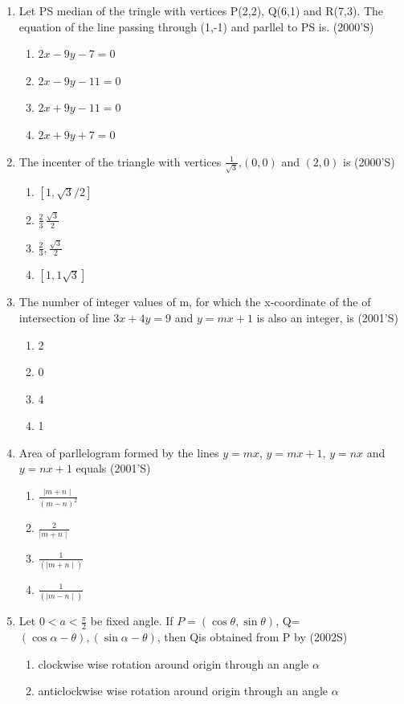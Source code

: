 \documentclass[12pt]{article}
\begin{document}
\begin{enumerate}
\item Let PS median of the tringle with vertices P(2,2), Q(6,1) and R(7,3). The equation of the line passing through (1,-1) and parllel to PS is. (2000'S)
\begin{enumerate}
\item $2x-9y-7=0$ 
\item $2x-9y-11=0$ 
\item $2x+9y-11=0$
\item $2x+9y+7=0$
\end{enumerate}
\item The incenter of the triangle with vertices $\frac{1}{\sqrt{3}}$,$(0,0)$ and $(2,0)$ is (2000'S)
\begin{enumerate}
\item $[1,\sqrt{3}/2]$ 
\item $\frac{2}{3}\,\frac{\sqrt{3}}{2}$ 
\item $\frac{2}{3},\frac{\sqrt{3}}{2}$ 
\item $[1,{1}{\sqrt{3}}]$
\end{enumerate}
\item The number of integer values of m, for which the x-coordinate of the of intersection of line $3x+4y=9$ and $y=mx+1$ is also an integer, is (2001'S)
\begin{enumerate}
\item 2 
\item 0 
\item 4   
\item 1
\end{enumerate}
\item Area of parllelogram formed by the lines $y=mx$, $y=mx+1$, $y=nx$ and $y=nx+1$ equals (2001'S)
\begin{enumerate}
\item $\frac{\mid m+n\mid}{(m-n)^2}$
\item $\frac{2}{\mid m+n \mid}$
\item $\frac{1}{(\mid m+n \mid)}$
\item $\frac{1}{(\mid m-n\mid)}$
\end{enumerate}
\item Let $0<a<\frac{\pi}{2}$ be fixed angle. If $P=(\cos\theta,\sin\theta)$, Q=$(\cos\alpha-\theta),(\sin\alpha-\theta)$, then Qis obtained from P by (2002S)
\begin{enumerate}
\item clockwise wise rotation around origin through an angle $\alpha$
\item anticlockwise wise rotation around origin through an angle $\alpha$

\end{enumerate}
\end{enumerate}
\end{document}
